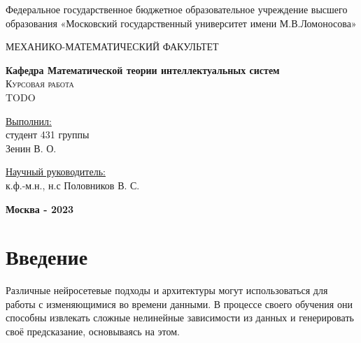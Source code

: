 \documentclass[diploma]{nanolab2015}
\begin{document}
\begin{titlepage}
    \begin{center}
        \large
        Федеральное государственное бюджетное образовательное учреждение
        высшего образования «Московский государственный университет имени
        М.В.Ломоносова»

        МЕХАНИКО-МАТЕМАТИЧЕСКИЙ ФАКУЛЬТЕТ

        \textbf{Кафедра Математической теории интеллектуальных систем}\\
        \vspace{4cm}
        \textsc{\Large Курсовая работа}\\[5mm]
        {\LARGE TODO}
    \end{center}
    \vspace{3cm}
    \null

    \begin{flushright}
        \normalsize \underline{Выполнил:}
        \\студент 431 группы
        \\Зенин В. О.
        \\ \underline{\hspace{4cm}}
    \end{flushright}
    \vspace{1cm}

    \begin{flushright}
        \normalsize \underline{Научный руководитель:}
        \\к.ф.-м.н., н.с Половников В. С.
        \\ \underline{\hspace{4cm}}
    \end{flushright}

    \vfill
    \begin{center}
        \textbf{Москва - 2023}
    \end{center}
\end{titlepage}
\setcounter{page}{2}
\tableofcontents{}  %
\newpage

\section{Введение}
Различные нейросетевые подходы и архитектуры могут использоваться для работы с изменяющимися во времени данными. В процессе своего обучения они способны извлекать сложные нелинейные зависимости из данных и генерировать своё предсказание, основываясь на этом.
\end{document}
